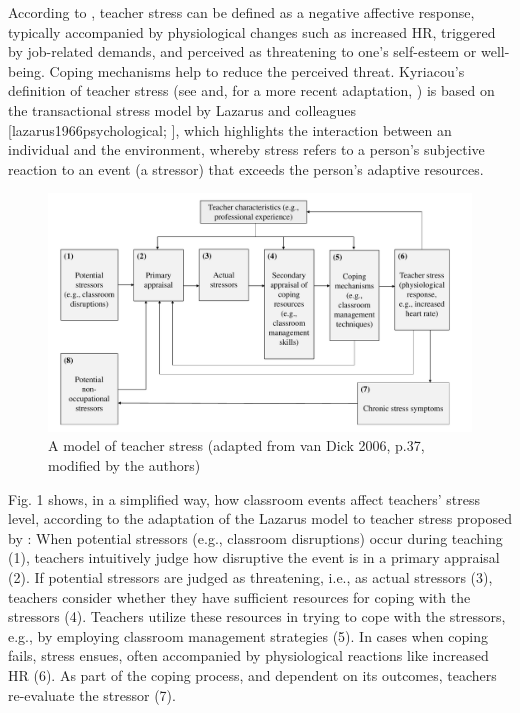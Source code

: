 \documentclass[preprint, 3p,
authoryear]{elsarticle} %
\begin{document}
According to \citet{kyriacou1978}, teacher stress can be defined as a
negative affective response, typically accompanied by physiological
changes such as increased HR, triggered by job-related demands, and
perceived as threatening to one's self-esteem or well-being. Coping
mechanisms help to reduce the perceived threat. Kyriacou's definition of
teacher stress (see \citet{kyriacou1978} and, for a more recent
adaptation, \citet{van2006stress}) is based on the transactional stress
model by Lazarus and colleagues {[}lazarus1966psychological;
\citet{lazarus1990theory}{]}, which highlights the interaction between
an individual and the environment, whereby stress refers to a person's
subjective reaction to an event (a stressor) that exceeds the person's
adaptive resources.

\begin{figure}[htbp]
  \centering
  \includegraphics[width=1\textwidth]{images/Model_Teacher_Stress_adapted_new.pdf}
  \caption{A model of teacher stress (adapted from van Dick 2006, p.37, modified by the authors)}
  \label{A model of teacher stress (adapted from van Dick 2006, p.37, modified by the authors)}
\end{figure}

Fig. 1 shows, in a simplified way, how classroom events affect teachers'
stress level, according to the adaptation of the Lazarus model to
teacher stress proposed by \citet{van2006stress}: When potential
stressors (e.g., classroom disruptions) occur during teaching (1),
teachers intuitively judge how disruptive the event is in a primary
appraisal (2). If potential stressors are judged as threatening, i.e.,
as actual stressors (3), teachers consider whether they have sufficient
resources for coping with the stressors (4). Teachers utilize these
resources in trying to cope with the stressors, e.g., by employing
classroom management strategies (5). In cases when coping fails, stress
ensues, often accompanied by physiological reactions like increased HR
(6). As part of the coping process, and dependent on its outcomes,
teachers re-evaluate the stressor (7).
\end{document}
